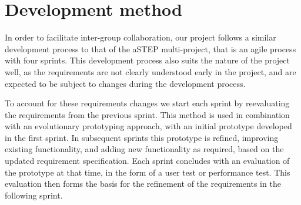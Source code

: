 \section{Development method} \label{sec:dev_method}
In order to facilitate inter-group collaboration, our project follows a similar development process to that of the aSTEP multi-project, that is an agile process with four sprints. This development process also suits the nature of the project well, as the requirements are not clearly understood early in the project, and are expected to be subject to changes during the development process. 

To account for these requirements changes we start each sprint by reevaluating the requirements from the previous sprint. This method is used in combination with an evolutionary prototyping approach, with an initial prototype developed in the first sprint. In subsequent sprints this prototype is refined, improving existing functionality, and adding new functionality as required, based on the updated requirement specification. Each sprint concludes with an evaluation of the prototype at that time, in the form of a user test or performance test. This evaluation then forms the basis for the refinement of the requirements in the following sprint. 

